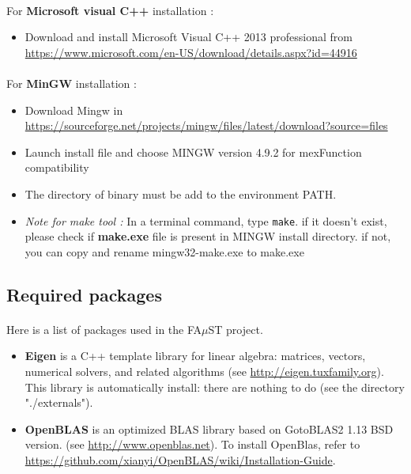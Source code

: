 \begin{enumerate}
\paragraph{}For \textbf{Microsoft visual C++} installation :
\begin{itemize}
\item Download and install Microsoft Visual C++ 2013 professional from \url{https://www.microsoft.com/en-US/download/details.aspx?id=44916}
\end{itemize}

\paragraph{}For \textbf{MinGW} installation :
\begin{itemize}
\item Download Mingw in \url{https://sourceforge.net/projects/mingw/files/latest/download?source=files}
\item Launch install file and choose MINGW version 4.9.2 for mexFunction compatibility 
\item The directory of binary must be add to the environment PATH. 

\item \textit{Note for make tool :} In a terminal command, type \texttt{make}. if it doesn't exist, please check if \textbf{make.exe} file is present in MINGW install directory. if not, you can copy and rename mingw32-make.exe to make.exe
\end{itemize}

\end{enumerate}


\subsection{Required packages}\label{sec:WinRequiredPackages}
\paragraph{}Here is a list of packages used in the FA$\mu$ST project.
\begin{itemize}
\item \textbf{Eigen} is a C++ template library for linear algebra: matrices, vectors, numerical solvers, and related algorithms (see \url{http://eigen.tuxfamily.org}). This library is automatically install: there are nothing to do (see the directory "./externals").
\item \textbf{OpenBLAS} is an optimized BLAS library based on GotoBLAS2 1.13 BSD version. (see \url{http://www.openblas.net}). To install OpenBlas, refer to \url{https://github.com/xianyi/OpenBLAS/wiki/Installation-Guide}. 

\end{itemize}


